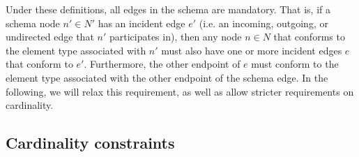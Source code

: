 \documentclass[a4paper]{article}
\begin{document}
Under these definitions, all edges in the schema are mandatory. That is, if a schema node $n' \in N'$ has an incident edge $e'$ (i.e. an incoming, outgoing, or undirected edge that $n'$ participates in), then any node $n \in N$ that conforms to the element type associated with $n'$ must also have one or more incident edges $e$ that conform to $e'$. Furthermore, the other endpoint of $e$ must conform to the element type associated with the other endpoint of the schema edge. In the following, we will relax this requirement, as well as allow stricter requirements on cardinality.

\subsection{Cardinality constraints}

\end{document}
